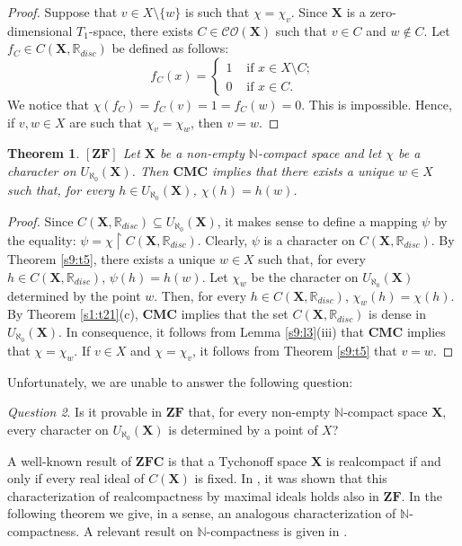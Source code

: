 \documentclass[12pt,twoside,leqno]{article}
\theoremstyle{plain}
\newtheorem{theorem}{Theorem}[section]
\theoremstyle{definition}
\theoremstyle{remark}
\newtheorem{question}[theorem]{Question}
\begin{document}
\begin{proof}
	Suppose that $v\in X\setminus\{w\}$ is such that $\chi=\chi_v$. Since $\mathbf{X}$ is a zero-dimensional $T_1$-space, there exists $C\in\mathcal{CO}(\mathbf{X})$ such that $v\in C$ and $w\notin C$. Let $f_C\in C(\mathbf{X}, \mathbb{R}_{disc})$ be  defined as follows:
	$$
	f_C(x)=\begin{cases} 1 &\text{ if } x\in X\setminus C;\\
		0 &\text{ if } x\in C.\end{cases}
	$$
	We notice that $\chi(f_C)=f_C(v)=1=f_C(w)=0$. This is impossible. Hence, if $v,w\in X$ are such that $\chi_v=\chi_w$, then $v=w$. 
\end{proof}

\begin{theorem}
	\label{s9:t6}
	$[\mathbf{ZF}]$ Let $\mathbf{X}$ be a non-empty $\mathbb{N}$-compact space and let $\chi$ be a character on $U_{\aleph_0}(\mathbf{X})$. Then $\mathbf{CMC}$ implies that there exists a unique $w\in X$ such that, for every $h\in U_{\aleph_0}(\mathbf{X})$, $\chi(h)=h(w)$. 
\end{theorem}
\begin{proof}
	Since $C(\mathbf{X},\mathbb{R}_{disc})\subseteq U_{\aleph_0}(\mathbf{X})$, it makes sense to define a mapping $\psi$ by the equality: $\psi=\chi\upharpoonright C(\mathbf{X}, \mathbb{R}_{disc})$. Clearly, $\psi$ is a character on $C(\mathbf{X}, \mathbb{R}_{disc})$. By Theorem \ref{s9:t5}, there exists a unique $w\in X$ such that, for every $h\in C(\mathbf{X}, \mathbb{R}_{disc})$, $\psi(h)=h(w)$. Let $\chi_w$ be the character on $U_{\aleph_0}(\mathbf{X})$ determined by the point $w$. Then, for every $h\in C(\mathbf{X}, \mathbb{R}_{disc})$, $\chi_w(h)=\chi(h)$. By Theorem \ref{s1:t21}(c), $\mathbf{CMC}$ implies that the set $C(\mathbf{X}, \mathbb{R}_{disc})$ is dense in $U_{\aleph_0}(\mathbf{X})$. In consequence, it follows from Lemma \ref{s9:l3}(iii) that $\mathbf{CMC}$ implies that  $\chi=\chi_w$. If $v\in X$ and $\chi=\chi_v$, it follows from Theorem \ref{s9:t5} that $v=w$.
\end{proof}

Unfortunately, we are unable to answer the following question:
\begin{question}
	\label{s9:q7}
	Is it provable in $\mathbf{ZF}$ that, for every non-empty $\mathbb{N}$-compact space $\mathbf{X}$, every character on $U_{\aleph_0}(\mathbf{X})$ is determined by a point of $X$?
\end{question}

A well-known result of $\mathbf{ZFC}$ is that a Tychonoff space $\mathbf{X}$ is realcompact if and only if every real ideal of $C(\mathbf{X})$ is fixed. In \cite{com}, it was shown that this characterization of realcompactness by maximal ideals holds also in $\mathbf{ZF}$. In the following theorem we give, in a sense, an analogous characterization of $\mathbb{N}$-compactness. A relevant result on $\mathbb{N}$-compactness is given in \cite[Theorem 2.2]{ol}.
\end{document}
